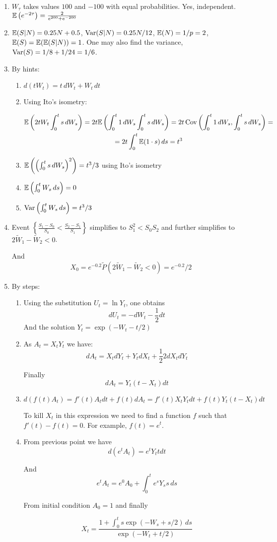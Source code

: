 \documentclass[12pt, a4paper]{article}
\begin{document}
\begin{enumerate}
\item $W_{\tau}$ takes values $100$ and $-100$ with equal probabilities. Yes, independent. $\mathbb{E}\left(  e^{-2\tau} \right) = \frac{2}{e^{200}+e^{-200}}$
\item $\mathbb{E}(S|N)=0.25N+0.5$, $\operatorname{Var}(S|N)=0.25N/12$, $\mathbb{E}(N)=1/p=2$, $\mathbb{E}(S)=\mathbb{E}(\mathbb{E}(S|N))=1$. One may also find the variance, $\operatorname{Var}(S)=1/8+1/24=1/6$.
\item By hints:
\begin{enumerate}
\item $d(tW_t)=t \, dW_t+W_t \, dt$
\item Using Ito's isometry:

\begin{multline}
\mathbb{E}\left(2t W_t\int_0^t s \, dW_s\right) = 2t \mathbb{E}\left(\int_0^t 1 \, dW_s \int_0^t s \, dW_s\right) =
2t \operatorname{Cov}\left(\int_0^t 1 \, dW_s, \int_0^t s \, dW_s\right) = \\
= 2t \int_0^t \mathbb{E}( 1 \cdot s) \, ds = t^3
\end{multline}



\item $\mathbb{E}\left(\left(\int_0^t s \, dW_s\right)^2 \right)=t^3/3$ using Ito's isometry
\item $\mathbb{E}\left(  \int_0^t W_s \, ds  \right)=0$
\item $\operatorname{Var}\left(  \int_0^t W_s \, ds  \right)=t^3/3$
\end{enumerate}
\item Event $\left\{ \frac{S_1-S_0}{S_0} < \frac{S_2-S_1}{S_1} \right\}$ simplifies to $S_1^2<S_0 S_2$ and further simplifies to $2\tilde{W}_1 - \tilde{W}_2 < 0$.

And
\[
X_0=e^{-0.2}\tilde{P}(2\tilde{W}_1 - \tilde{W}_2 < 0) = e^{-0.2}/2
\]

\item By steps:

\begin{enumerate}
\item Using the substitution $U_t=\ln Y_t$, one obtains
\[
dU_t= - dW_t - \frac{1}{2}dt
\]
And the solution $Y_t=\exp(-W_t-t/2)$
\item As $A_t = X_t Y_t$ we have:
\[
dA_t = X_t dY_t + Y_t dX_t + \frac{1}{2} 2 dX_t dY_t
\]

Finally
\[
dA_t= Y_t (t-X_t)dt
\]
\item
\[
d(f(t)A_t) = f'(t) A_t dt + f(t) dA_t = f'(t) X_t Y_t dt + f(t)Y_t (t - X_t)dt
\]

To kill $X_t$ in this expression we need to find a function $f$ such that $f'(t)- f(t)=0$. For example, $f(t)=e^t$.
\item From previous point we have
\[
d(e^t A_t) = e^t Y_t t dt
\]

And
\[
e^t A_t = e^0 A_0 + \int_0^t e^s Y_s s \, ds
\]

From initial condition $A_0=1$ and finally

\[
X_t=\frac{1+\int_0^t s \exp(-W_s+s/2) \, ds}{ \exp(-W_t +t/2 )}
\]
\end{enumerate}


\end{enumerate}
\end{document}
